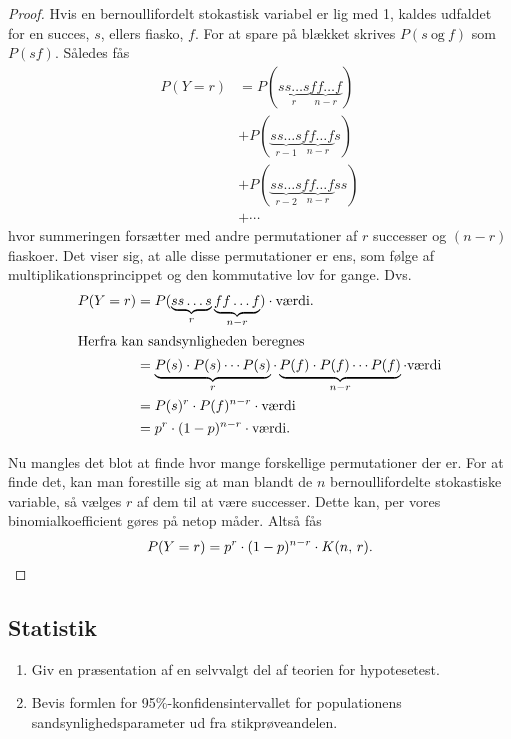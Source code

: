 \documentclass{article}
\begin{document}
\begin{proof}
Hvis en bernoullifordelt stokastisk variabel er lig med 1, kaldes udfaldet for
en succes, $s$, ellers fiasko, $f$. For at spare på blækket skrives
$P(s\:\text{og}\:f)$ som $P(sf)$. Således fås
\begin{align*}
    P(Y = r) &= P(\underbrace{ss \dotso s}_r \underbrace{ff \dotso f}_{n-r})\\ 
             &+ P(\underbrace{ss \dotso s}_{r-1} \underbrace{ff \dotso f}_{n-r}s)\\
             &+ P(\underbrace{ss \dotso s}_{r-2} \underbrace{ff \dotso f}_{n-r}ss)\\
             &+ \dotsb
\end{align*}
hvor summeringen forsætter med andre permutationer af $r$ successer og $(n-r)$
fiaskoer. Det viser sig, at alle disse permutationer er ens, som følge af
multiplikationsprincippet og den kommutative lov for gange. Dvs.
\begin{align*}
    P(Y = r) &= P(\underbrace{ss \dotso s}_r \underbrace{ff \dotso f}_{n-r}) \cdot \text{værdi}.\\
    \intertext{Herfra kan sandsynligheden beregnes}
             &= \underbrace{P(s) \cdot P(s) \dotsm P(s)}_r \cdot 
             \underbrace{P(f) \cdot P(f) \dotsm P(f)}_{n-r} \cdot \text{værdi}\\
             &= P(s)^r \cdot P(f)^{n-r} \cdot \text{værdi}\\
             &= p^r \cdot (1-p)^{n-r} \cdot \text{værdi}.
\end{align*}


Nu mangles det blot at finde hvor mange forskellige permutationer der er. For at
finde det, kan man forestille sig at man blandt de $n$ bernoullifordelte
stokastiske variable, så vælges $r$ af dem til at være successer. Dette kan, per
vores binomialkoefficient gøres på netop  måder. Altså fås
\[
    P(Y = r) = p^r \cdot (1-p)^{n-r} \cdot \nobreak{K(n,\,r)}.\qedhere
\] 
\end{proof}

\begin{tcolorbox}
    \section{Statistik}
    \tcblower
    \begin{enumerate}
        \item Giv en præsentation af en selvvalgt del af teorien for
            hypotesetest.
        \item Bevis formlen for 95\%-konfidensintervallet for populationens
            sandsynlighedsparameter ud fra stikprøveandelen.     
    \end{enumerate}
\end{tcolorbox}
\end{document}
